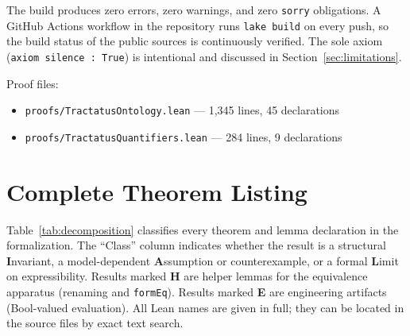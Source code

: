 \documentclass[10pt, letterpaper]{article}
\theoremstyle{definition}
\theoremstyle{remark}
\begin{document}
\noindent
The build produces zero errors, zero warnings, and zero
\texttt{sorry} obligations.  A GitHub Actions workflow in the
repository runs \texttt{lake build} on every push, so the build
status of the public sources is continuously verified.  The sole axiom
(\texttt{axiom silence : True}) is intentional and
discussed in Section~\ref{sec:limitations}.

Proof files:
\begin{itemize}[nosep]
  \item \texttt{proofs/TractatusOntology.lean} --- 1,345 lines, 45 declarations
  \item \texttt{proofs/TractatusQuantifiers.lean} --- 284 lines, 9 declarations
\end{itemize}

\section{Complete Theorem Listing}
\label{app:theorems}

Table~\ref{tab:decomposition} classifies every theorem and lemma
declaration in the formalization.  The ``Class'' column indicates
whether the result is a structural \textbf{I}nvariant,
a model-dependent \textbf{A}ssumption or counterexample, or a
formal \textbf{L}imit on expressibility.  Results marked
\textbf{H} are helper lemmas for the equivalence apparatus
(renaming and \texttt{formEq}).
Results marked \textbf{E} are engineering artifacts
(Bool-valued evaluation).  All Lean names are given in full;
they can be located in the source files by exact text search.
\end{document}

